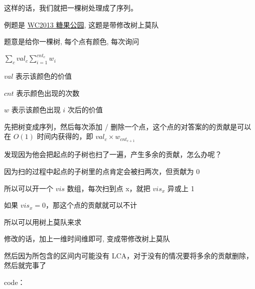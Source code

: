 这样的话，我们就把一棵树处理成了序列。

例题是 \href{https://www.luogu.org/problemnew/show/P4074}{WC2013 糖果公园}, 这题是带修改树上莫队

题意是给你一棵树, 每个点有颜色, 每次询问

$\sum_{c}val_c\sum_{i=1}^{cnt_c}w_i$

$val$ 表示该颜色的价值

$cnt$ 表示颜色出现的次数

$w$ 表示该颜色出现 $i$ 次后的价值

先把树变成序列，然后每次添加 / 删除一个点，这个点的对答案的的贡献是可以在 $O(1)$ 时间内获得的，即 $val_c\times w_{cnt_{c+1}}$

发现因为他会把起点的子树也扫了一遍，产生多余的贡献，怎么办呢？

因为扫的过程中起点的子树里的点肯定会被扫两次，但贡献为 0

所以可以开一个 $vis$ 数组，每次扫到点 x，就把 $vis_x$ 异或上 1

如果 $vis_x=0$，那这个点的贡献就可以不计

所以可以用树上莫队来求

修改的话，加上一维时间维即可, 变成带修改树上莫队

然后因为所包含的区间内可能没有 LCA，对于没有的情况要将多余的贡献删除，然后就完事了

code：

